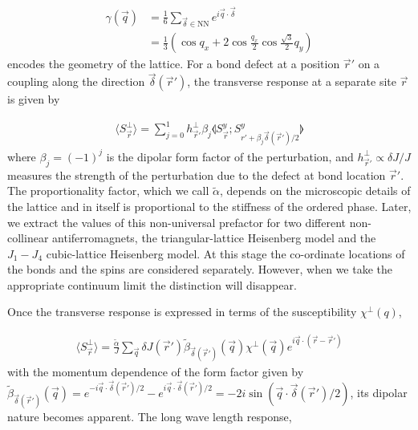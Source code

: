 \documentclass[twocolumn,english,aps,prl,floatfix]{revtex4-1}
\begin{document}
\begin{equation}\label{eq:gamma}
    \begin{aligned}
        \gamma(\vec{q})
        &=\frac{1}{6}\sum_{\vec{\delta}\in\text{NN}}
        e^{i\vec{q}\cdot\vec{\delta}} \\
        &=\frac{1}{3}\left(\cos q_x + 2\cos\frac{q_x}{2}
        \cos\frac{\sqrt{3}}{2}q_y\right)
    \end{aligned}
\end{equation}
encodes the geometry of the lattice.
For a bond defect at a position $\vec{r}'$ on a coupling along the 
direction $\vec{\delta}(\vec{r}')$, the transverse response at a 
separate site $\vec{r}$ is given by

\begin{align}
    \langle S_{\vec{r}}^\perp \rangle = \sum_{j=0}^1 h_{\vec{r}'}^\perp 
    \beta_j \llangle S_{\vec{r}}^y; 
    S_{r'+\beta_j\vec{\delta}(\vec{r}')/2}^y \rrangle 
\end{align}
where $\beta_j=(-1)^j$ is the dipolar form factor of the perturbation, 
and $h_{\vec{r}'}^\perp \propto \delta J/J$ measures the strength of 
the perturbation due to the defect at bond location $\vec{r}'$. 
The proportionality factor, which we call $\tilde{\alpha}$, depends 
on the microscopic details of the lattice 
and in itself is proportional to the stiffness of the ordered phase. 
Later, we extract the values of this non-universal prefactor for 
two different non-collinear antiferromagnets, the triangular-lattice 
Heisenberg model and the $J_1-J_4$ cubic-lattice Heisenberg model.
At this stage the co-ordinate locations of the bonds and the spins 
are considered separately. However, when we take the appropriate 
continuum limit the distinction will disappear.

Once the transverse response is expressed in terms of the 
susceptibility $\chi^\perp(q)$,

\begin{align}
    \langle S_{\vec{r}}^\perp \rangle = \frac{\tilde{\alpha}}{J}
    \sum_{\vec{q}} \delta J(\vec{r}')
    \tilde{\beta}_{\vec{\delta}(\vec{r}')}(\vec{q})\chi^\perp(\vec{q})
    e^{i\vec{q}\cdot\left(\vec{r}-\vec{r}'\right)}
\end{align}
with the momentum dependence of the form factor given by 
$\tilde{\beta}_{\vec{\delta}(\vec{r}')}(\vec{q})=
e^{-i\vec{q}\cdot\vec{\delta}(\vec{r}')/2}-
e^{i\vec{q}\cdot\vec{\delta}(\vec{r}')/2}
=-2i\sin(\vec{q}\cdot\vec{\delta}(\vec{r}')/2)$, its dipolar nature 
becomes apparent. The long wave length response, 
\end{document}
